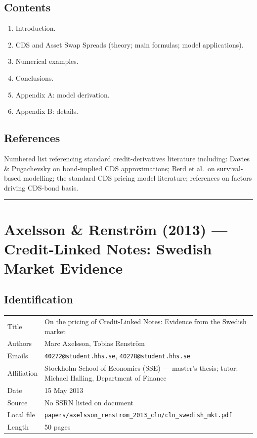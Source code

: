\documentclass[11pt,a4paper]{article}
\begin{document}
\subsection*{Contents}
\begin{enumerate}[noitemsep]
  \item Introduction.
  \item CDS and Asset Swap Spreads (theory; main formulas; model applications).
  \item Numerical examples.
  \item Conclusions.
  \item Appendix A: model derivation.
  \item Appendix B: details.
\end{enumerate}

\subsection*{References}
Numbered list referencing standard credit-derivatives literature including: Davies \& Pugachevsky on bond-implied CDS approximations; Berd et al.\ on survival-based modelling; the standard CDS pricing model literature; references on factors driving CDS-bond basis.

\bigskip\hrule\bigskip

\section{Axelsson \& Renström (2013) --- Credit-Linked Notes: Swedish Market Evidence}
\label{bib:axelsson-renstrom-2013-cln}

\subsection*{Identification}
\begin{tabular}{@{}p{3.5cm}p{11cm}@{}}
\toprule
Title           & On the pricing of Credit-Linked Notes: Evidence from the Swedish market \\
Authors         & Marc Axelsson, Tobias Renström \\
Emails          & \texttt{40272@student.hhs.se}, \texttt{40278@student.hhs.se} \\
Affiliation     & Stockholm School of Economics (SSE) --- master's thesis; tutor: Michael Halling, Department of Finance \\
Date            & 15 May 2013 \\
Source          & No SSRN listed on document \\
Local file      & \texttt{papers/axelsson\_renstrom\_2013\_cln/cln\_swedish\_mkt.pdf} \\
Length          & 50 pages \\
\bottomrule
\end{tabular}
\end{document}

